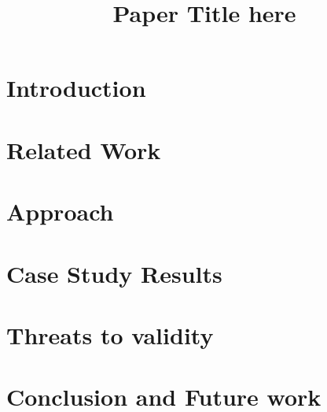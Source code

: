\documentclass[conference]{IEEEtran}
\begin{document}
\title{Paper Title here}

\author{

}

\maketitle

\begin{abstract}
\end{abstract}

\IEEEpeerreviewmaketitle

\section{Introduction}
\label{sec:introduction}


\section{Related Work}
\label{sec:related_work}


\section{Approach}
\label{sec:approach}


\section{Case Study Results}
\label{sec:results}


\section{Threats to validity}
\label{sec:threats_to_validity}


\section{Conclusion and Future work}
\label{sec:conclusion}




\end{document}
